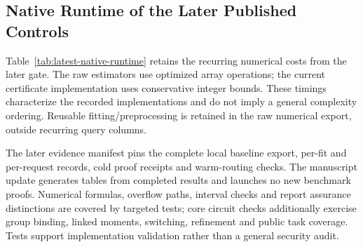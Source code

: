 \subsection{Native Runtime of the Later Published Controls}
\label{app:latest-runtime}
Table~\ref{tab:latest-native-runtime} retains the recurring numerical costs
from the later gate. The raw estimators use optimized array operations;
the current certificate implementation uses conservative integer bounds.
These timings characterize the recorded implementations and do not imply
a general complexity ordering. Reusable fitting/preprocessing is retained
in the raw numerical export, outside recurring query columns.


The later evidence manifest pins the complete local baseline export,
per-fit and per-request records, cold proof receipts and warm-routing
checks. The manuscript update generates tables from completed results and
launches no new benchmark proofs. Numerical formulas, overflow paths,
interval checks and report assurance distinctions are covered by targeted
tests; core circuit checks additionally exercise group binding, linked
moments, switching, refinement and public task coverage. Tests support
implementation validation rather than a general security audit.

